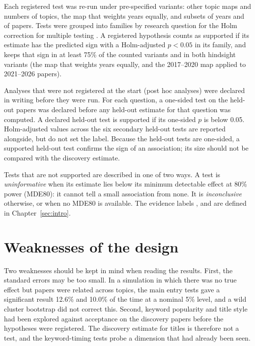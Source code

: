 Each registered test was re-run under pre-specified variants: other topic maps and numbers of topics, the map that
weights years equally, and subsets of years and of papers. Tests were grouped into families by research question for
the Holm correction for multiple testing \citep{holm1979simple}. A registered hypothesis counts as supported if its
estimate has the predicted sign with a Holm-adjusted $p < 0.05$ in its family, and keeps that sign in at least 75\% of
the counted variants and in both hindsight variants (the map that weights years equally, and the 2017--2020 map applied
to 2021--2026 papers).

Analyses that were not registered at the start (post hoc analyses) were declared in writing before they were run. For
each question, a one-sided test on the held-out papers was declared before any held-out estimate for that question was
computed. A declared held-out test is supported if its one-sided $p$ is below 0.05. Holm-adjusted values across the six
secondary held-out tests are reported alongside, but do not set the label. Because the held-out tests are one-sided, a
supported held-out test confirms the sign of an association; its size should not be compared with the discovery
estimate.

Tests that are not supported are described in one of two ways. A test is \emph{uninformative} when its estimate lies
below its minimum detectable effect at 80\% power (MDE80): it cannot tell a small association from none. It is
\emph{inconclusive} otherwise, or when no MDE80 is available. The evidence labels ,  and  are defined in Chapter~\ref{sec:intro}.

\section{Weaknesses of the design}
\label{sec:threats}

Two weaknesses should be kept in mind when reading the results. First, the standard errors may be too small. In a
simulation in which there was no true effect but papers were related across topics, the main entry tests gave a
significant result 12.6\% and 10.0\% of the time at a nominal 5\% level, and a wild cluster bootstrap
\citep{cameron2008bootstrap} did not correct this. Second, keyword popularity and title style had been explored against
acceptance on the discovery papers before the hypotheses were registered. The discovery estimate for titles is
therefore not a test, and the keyword-timing tests probe a dimension that had already been seen.
